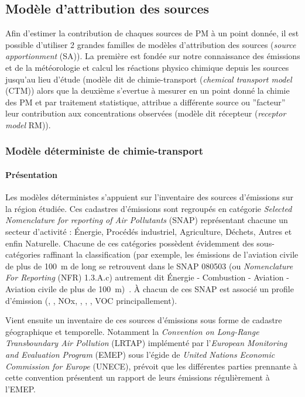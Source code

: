 \subsection{Modèle d'attribution des sources}%
\label{sec:source_apportionment_model}

Afin d'estimer la contribution de chaques sources de PM à un point donnée, il est possible
d'utiliser 2 grandes familles de modèles d'attribution des sources (\textit{source
apportionment} (SA)). La première est fondée sur notre connaissance des
émissions et de la météorologie et calcul les réactions physico chimique depuis les
sources jusqu'au lieu d'étude (modèle dit de chimie-transport (\textit{chemical transport
model} (CTM)) alors que la deuxième s'evertue à mesurer en un point donné
la chimie des PM et par traitement statistique, attribue a différente source ou
''facteur'' leur contribution aux concentrations observées (modèle dit récepteur
(\textit{receptor model} RM)).

\subsubsection{Modèle déterministe de chimie-transport}%
\label{ssub:modele_deterministe_de_chimietransport}

\paragraph{Présentation}%
\label{par:presentation}

Les modèles déterministes s'appuient sur l'inventaire des sources d'émissions sur la
région étudiée. Ces cadastres d'émissions sont regroupés en catégorie \textit{Selected
Nomenclature for reporting of Air Pollutants} (SNAP) représentant chacune un secteur
d'activité : Énergie, Procédés industriel, Agriculture, Déchets, Autres et enfin
Naturelle.
Chacune de ces catégories possèdent évidemment des sous-catégories raffinant la
classification (par exemple, les émissions de l'aviation civile de plus de \SI{100}{m} de
long se retrouvent dans le SNAP 080503 (ou \textit{Nomenclature For Reporting} (NFR)
1.3.A.c) autrement dit Énergie - Combustion - Aviation - Aviation civile de plus de
\SI{100}{m})~\autocite{europeanenvironmentagencyEMEP2019}.
À chacun de ces SNAP est associé un profile d'émission (, , NOx, , \PMdix, \PMdc,
VOC principallement).

Vient ensuite un inventaire de ces sources d'émissions sous forme de cadastre géographique
et temporelle. Notamment la \textit{Convention on Long-Range Transboundary Air
Pollution} (LRTAP) implémenté par l'\textit{European Monitoring and Evaluation Program}
(EMEP) sous l'égide de \textit{United Nations Economic Commission for Europe} (UNECE),
prévoit que les différentes parties prennante à cette convention présentent un rapport de
leurs émissions régulièrement à l'EMEP.

